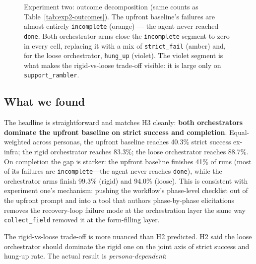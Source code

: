 \documentclass[11pt,a4paper]{article}
\begin{document}
\begin{figure}[htbp]
  \centering
  
  \caption{Experiment two: outcome decomposition (same counts as
  Table~\ref{tab:exp2-outcomes}). The upfront baseline's failures are
  almost entirely \texttt{incomplete} (orange) --- the agent never
  reached \texttt{done}. Both orchestrator arms close the
  \texttt{incomplete} segment to zero in every cell, replacing it with a
  mix of \texttt{strict\_fail} (amber) and, for the loose orchestrator,
  \texttt{hung\_up} (violet). The violet segment is what makes the
  rigid-vs-loose trade-off visible: it is large only on
  \texttt{support\_rambler}.}
  \label{fig:chart-exp2-outcomes}
\end{figure}

\subsection{What we found}

The headline is straightforward and matches H3 cleanly: \textbf{both orchestrators dominate the upfront baseline on strict success and completion}. Equal-weighted across personas, the upfront baseline reaches 40.3\% strict success ex-infra; the rigid orchestrator reaches 83.3\%; the loose orchestrator reaches 88.7\%. On completion the gap is starker: the upfront baseline finishes 41\% of runs (most of its failures are \texttt{incomplete}---the agent never reaches \texttt{done}), while the orchestrator arms finish 99.3\% (rigid) and 94.0\% (loose). This is consistent with experiment one's mechanism: pushing the workflow's phase-level checklist out of the upfront prompt and into a tool that authors phase-by-phase elicitations removes the recovery-loop failure mode at the orchestration layer the same way \texttt{collect\_field} removed it at the form-filling layer.

The rigid-vs-loose trade-off is more nuanced than H2 predicted. H2 said the loose orchestrator should dominate the rigid one on the joint axis of strict success and hung-up rate. The actual result is \emph{persona-dependent}:
\end{document}
